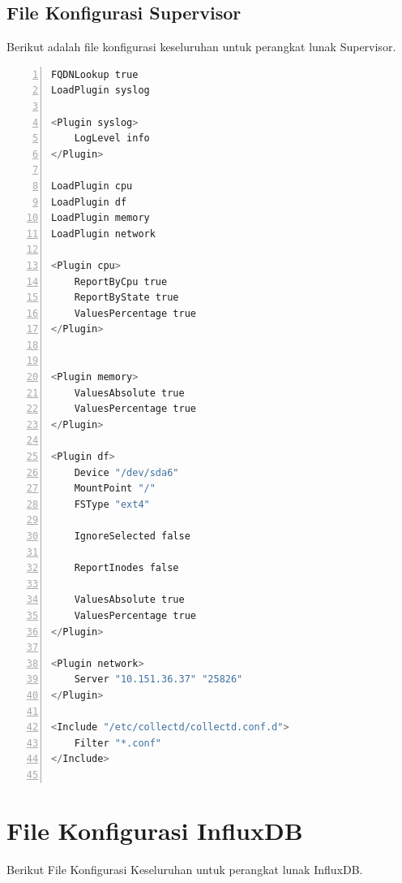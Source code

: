 \subsection{File Konfigurasi Supervisor}
Berikut adalah file konfigurasi keseluruhan untuk perangkat lunak Supervisor.

  
  \begin{lstlisting}[numbers=left, frame=single,tabsize=2,breaklines,caption={Kode sumber Model Auth},label=modelAuth, language=python]
FQDNLookup true
LoadPlugin syslog

<Plugin syslog>
	LogLevel info
</Plugin>

LoadPlugin cpu
LoadPlugin df
LoadPlugin memory
LoadPlugin network

<Plugin cpu>
	ReportByCpu true
	ReportByState true
	ValuesPercentage true
</Plugin>


<Plugin memory>
	ValuesAbsolute true
	ValuesPercentage true
</Plugin>

<Plugin df>
	Device "/dev/sda6"
	MountPoint "/"
	FSType "ext4"

	IgnoreSelected false

	ReportInodes false

	ValuesAbsolute true
	ValuesPercentage true
</Plugin>

<Plugin network>
	Server "10.151.36.37" "25826"
</Plugin>

<Include "/etc/collectd/collectd.conf.d">
	Filter "*.conf"
</Include>


\end{lstlisting}

\section{File Konfigurasi InfluxDB}
\label{lampiranKonfigurasi InfluxDB}
  Berikut File Konfigurasi Keseluruhan untuk perangkat lunak InfluxDB.
  
